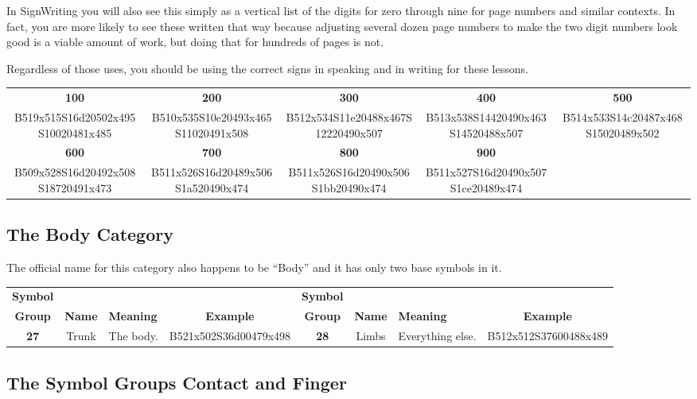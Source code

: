 \documentclass{article}
\begin{document}
In SignWriting you will also see this simply as a vertical list of the digits for zero through nine for page numbers and similar contexts.
In fact, you are more likely to see these written that way because adjusting several dozen page numbers to make the two digit numbers look good is a viable amount of work, but doing that for hundreds of pages is not.

Regardless of those uses, you should be using the correct signs in speaking and in writing for these lessons.

\begin{center}
\begin{tabular}{*{5}{c}}
\textbf{100}&\textbf{200}&\textbf{300}&\textbf{400}&\textbf{500}\\
B519x515S16d20502x495S10020481x485&
B510x535S10e20493x465S11020491x508&
B512x534S11e20488x467S12220490x507&
B513x538S14420490x463S14520488x507&
B514x533S14c20487x468S15020489x502\\
\textbf{600}&\textbf{700}&\textbf{800}&\textbf{900}\\
B509x528S16d20492x508S18720491x473&
B511x526S16d20489x506S1a520490x474&
B511x526S16d20490x506S1bb20490x474&
B511x527S16d20490x507S1ce20489x474\\
\end{tabular}
\end{center}

\subsection{The Body Category}

The official name for this category also happens to be ``Body'' and it has only two base symbols in it.

\begin{center}
\begin{tabular}{ccp{21mm}c@{\hskip 5mm}ccp{21mm}c}
\textbf{Symbol}&&&&\textbf{Symbol}\\
\textbf{Group}&\textbf{Name}&\textbf{Meaning}&\textbf{Example}&\textbf{Group}&\textbf{Name}&\textbf{Meaning}&\textbf{Example}\\
\textbf{27}&Trunk&The body.&B521x502S36d00479x498&\textbf{28}&Limbs&Everything else.&B512x512S37600488x489\\
\end{tabular}
\end{center}

\subsection{The Symbol Groups Contact and Finger}
\end{document}
